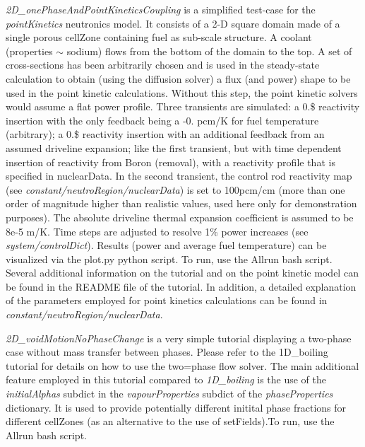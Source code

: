 \begin{DoxyItemize}
\item {\itshape 2\+D\+\_\+one\+Phase\+And\+Point\+Kinetics\+Coupling} is a simplified test-\/case for the {\itshape point\+Kinetics} neutronics model. It consists of a 2-\/D square domain made of a single porous cell\+Zone containing fuel as sub-\/scale structure. A coolant (properties $\sim$ sodium) flows from the bottom of the domain to the top. A set of cross-\/sections has been arbitrarily chosen and is used in the steady-\/state calculation to obtain (using the diffusion solver) a flux (and power) shape to be used in the point kinetic calculations. Without this step, the point kinetic solvers would assume a flat power profile. Three transients are simulated\+: a 0.\$ reactivity insertion with the only feedback being a -\/0. pcm/K for fuel temperature (arbitrary); a 0.\$ reactivity insertion with an additional feedback from an assumed driveline expansion; like the first transient, but with time dependent insertion of reactivity from Boron (removal), with a reactivity profile that is specified in nuclear\+Data. In the second transient, the control rod reactivity map (see {\itshape constant/neutro\+Region/nuclear\+Data}) is set to 100pcm/cm (more than one order of magnitude higher than realistic values, used here only for demonstration purposes). The absolute driveline thermal expansion coefficient is assumed to be 8e-\/5 m/K. Time steps are adjusted to resolve 1\% power increases (see {\itshape system/control\+Dict}). Results (power and average fuel temperature) can be visualized via the plot.\+py python script. To run, use the Allrun bash script. Several additional information on the tutorial and on the point kinetic model can be found in the R\+E\+A\+D\+ME file of the tutorial. In addition, a detailed explanation of the parameters employed for point kinetics calculations can be found in {\itshape constant/neutro\+Region/nuclear\+Data}.
\item {\itshape 2\+D\+\_\+void\+Motion\+No\+Phase\+Change} is a very simple tutorial displaying a two-\/phase case without mass transfer between phases. Please refer to the 1\+D\+\_\+boiling tutorial for details on how to use the two=phase flow solver. The main additional feature employed in this tutorial compared to {\itshape 1\+D\+\_\+boiling} is the use of the {\itshape initial\+Alphas} subdict in the {\itshape vapour\+Properties} subdict of the {\itshape phase\+Properties} dictionary. It is used to provide potentially different initital phase fractions for different cell\+Zones (as an alternative to the use of set\+Fields).To run, use the Allrun bash script.

\end{DoxyItemize}
